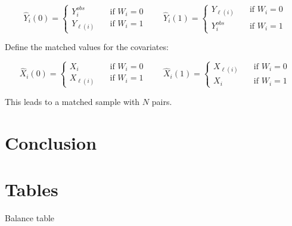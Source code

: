 \documentclass[oneside,11pt]{article}
\begin{document}
$$\hat{Y}_i(0) = 
\begin{cases}
Y_{i}^{obs} &\quad \text{if } W_i = 0\\ 
Y_{\ell(i)} &\quad \text{if } W_i = 1
\end{cases}
\quad \quad
\hat{Y}_i(1) = 
\begin{cases}
Y_{\ell(i)} &\quad \text{if } W_i = 0\\ 
Y_{i}^{obs} &\quad \text{if } W_i = 1
\end{cases}$$

Define the matched values for the covariates:

$$\hat{X}_i(0) = 
\begin{cases}
X_{i} &\quad \text{if } W_i = 0\\ 
X_{\ell(i)} &\quad \text{if } W_i = 1
\end{cases}
\quad \quad
\hat{X}_i(1) = 
\begin{cases}
X_{\ell(i)} &\quad \text{if } W_i = 0\\ 
X_{i} &\quad \text{if } W_i = 1
\end{cases}$$

This leads to a matched sample with $N$ pairs.

\section{Conclusion} \label{conclusion}



\newpage



\clearpage

%
%






\clearpage
\singlespacing

\section{Tables}

\begin{table}[H]
    \caption{Balance table}
    \label{balance_1}
    \begin{center}
    \scriptsize{}
    \end{center}
\end{table}
\end{document}
